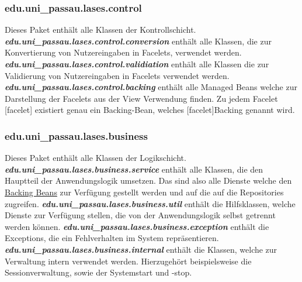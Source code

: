 \subsubsection{edu.uni\_passau.lases.control} \label{arch:control}
Dieses Paket enthält alle Klassen der Kontrollschicht.
\newline\newline
\textbf{\emph{edu.uni\_passau.lases.control.conversion}}
enthält alle Klassen, die zur Konvertierung von Nutzereingaben
in Facelets, verwendet werden.
\newline\newline
\textbf{\emph{edu.uni\_passau.lases.control.validiation}}
enthält alle Klassen die zur Validierung von Nutzereingaben
in Facelets verwendet werden.
\newline\newline
\textbf{\emph{edu.uni\_passau.lases.control.backing}}\label{arch:backing}
enthält alle Managed Beans welche zur Darstellung der Facelets aus der
View Verwendung finden. Zu jedem Facelet [facelet] existiert genau ein
Backing-Bean, welches [facelet]Backing genannt wird.

\subsubsection{edu.uni\_passau.lases.business}\label{arch:business}
Dieses Paket enthält alle Klassen der Logikschicht.
\newline\newline
\textbf{\emph{edu.uni\_passau.lases.business.service}}\label{arch:service}
enthält alle Klassen, die den Hauptteil der Anwendungslogik umsetzen.
Das sind also alle Dienste welche den
\hyperref[arch:backing]{Backing Beans} zur Verfügung
gestellt werden und auf die auf die %
Repositories zugreifen.
\newline\newline
\textbf{\emph{edu.uni\_passau.lases.business.util}}
enthält die Hilfsklassen, welche Dienste zur Verfügung stellen,
die von der Anwendungslogik selbst getrennt werden können.
\newline\newline
\textbf{\emph{edu.uni\_passau.lases.business.exception}} \label{arch:busex}
enthält die Exceptions, die ein Fehlverhalten im System repräsentieren.
\newline\newline
\textbf{\emph{edu.uni\_passau.lases.business.internal}}
enthält die Klassen, welche zur Verwaltung intern verwendet werden.
Hierzugehört beispielsweise die Sessionverwaltung, sowie der Systemstart und -stop.

